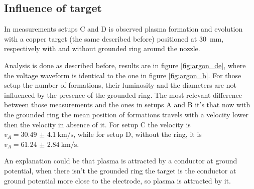 \subsection{Influence of target}
In measurements setups C and D is observed plasma formation and evolution with a copper target (the same described before) positioned at \SI{30}{\milli\meter}, respectively with and without grounded ring around the nozzle.

Analysis is done as described before, results are in figure \ref{fig:argon_de}, where the voltage waveform is identical to the one in figure \ref{fig:argon_b}.
For those setup the number of formations, their luminosity and the diameters are not influenced by the presence of the grounded ring.
The most relevant difference between those measurements and the ones in setups A and B it's that now with the grounded ring the mean position of formations travels with a velocity lower then the velocity in absence of it. For setup C the velocity is $v_A = \SI{30.49(410)}{\kilo\meter/\second}$, while for setup D, without the ring, it is $v_A = \SI{61.24(284)}{\kilo\meter/\second}$.

An explanation could be that plasma is attracted by a conductor at ground potential, when there isn't the grounded ring the target is the conductor at ground potential more close to the electrode, so plasma is attracted by it.

